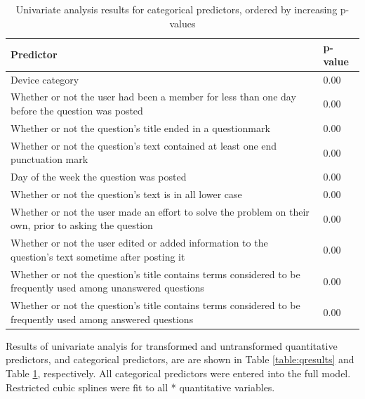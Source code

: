 \documentclass{article}
\begin{document}
\begin{table}[ht]
\centering
\caption{Univariate analysis results for categorical predictors, ordered by increasing p-values} 
\begin{tabular}{|p{12cm}|p{2cm}|}
  \hline
 Predictor & p-value \\ 
  \hline \hline
  Device category & 0.00 \\
  \hline
  Whether or not the user had been a member for less than one day before the question was posted & 0.00 \\ 
  \hline
  Whether or not the question's title ended in a questionmark & 0.00 \\ 
  \hline
  Whether or not the question's text contained at least one end punctuation mark & 0.00 \\ 
  \hline
  Day of the week the question was posted & 0.00 \\ 
  \hline
  Whether or not the question's text is in all lower case & 0.00 \\ 
  \hline
  Whether or not the user made an effort to solve the problem on their own, prior to asking the question & 0.00 \\ 
  \hline
  Whether or not the user edited or added information to the question's text sometime after posting it & 0.00 \\
  \hline
  Whether or not the question's title contains terms considered to be frequently used among unanswered questions & 0.00 \\ 
  \hline
  Whether or not the question's title contains terms considered to be frequently used among answered questions & 0.00 \\ 
   \hline
\end{tabular}
\label{table:cresults}
\end{table}

Results of univariate analyis for transformed and untransformed quantitative predictors, and categorical predictors, are are shown in Table \ref{table:qresults} and Table \ref{table:cresults}, respectively. All categorical predictors were entered into the full model. Restricted cubic splines were fit to all * quantitative variables.
\end{document}
